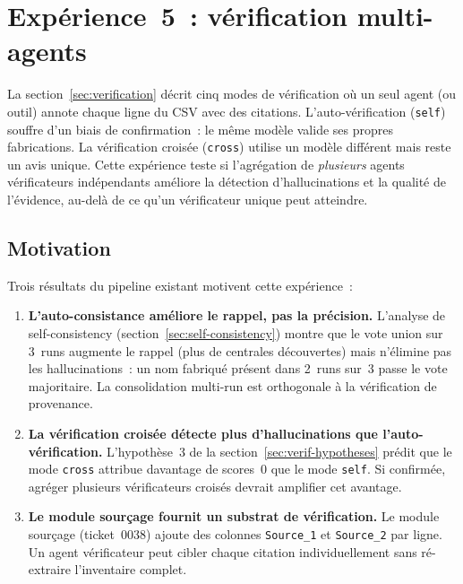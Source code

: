 %

\section{Exp\'erience~5~: v\'erification multi-agents}\label{sec:exp5}

La section~\ref{sec:verification} d\'ecrit cinq modes de v\'erification o\`u
un seul agent (ou outil) annote chaque ligne du CSV avec des citations.
L'auto-v\'erification (\texttt{self}) souffre d'un biais de confirmation~:
le m\^eme mod\`ele valide ses propres fabrications. La v\'erification crois\'ee
(\texttt{cross}) utilise un mod\`ele diff\'erent mais reste un avis unique. Cette
exp\'erience teste si l'agr\'egation de \emph{plusieurs} agents v\'erificateurs
ind\'ependants am\'eliore la d\'etection d'hallucinations et la qualit\'e de
l'\'evidence, au-del\`a de ce qu'un v\'erificateur unique peut atteindre.

\subsection{Motivation}\label{sec:multi-verif-motivation}

Trois r\'esultats du pipeline existant motivent cette exp\'erience~:

\begin{enumerate}
\item \textbf{L'auto-consistance am\'eliore le rappel, pas la pr\'ecision.}
  L'analyse de self-consistency (section~\ref{sec:self-consistency}) montre que
  le vote union sur 3~runs augmente le rappel (plus de centrales d\'ecouvertes)
  mais n'\'elimine pas les hallucinations~: un nom fabriqu\'e pr\'esent dans 2~runs
  sur~3 passe le vote majoritaire. La consolidation multi-run est orthogonale \`a
  la v\'erification de provenance.

\item \textbf{La v\'erification crois\'ee d\'etecte plus d'hallucinations que
  l'auto-v\'erification.}
  L'hypoth\`ese~3 de la section~\ref{sec:verif-hypotheses} pr\'edit que le mode
  \texttt{cross} attribue davantage de scores~0 que le mode \texttt{self}.
  Si confirm\'ee, agr\'eger plusieurs v\'erificateurs crois\'es devrait amplifier
  cet avantage.

\item \textbf{Le module sourçage fournit un substrat de v\'erification.}
  Le module sourçage (ticket~0038) ajoute des colonnes \texttt{Source\_1} et
  \texttt{Source\_2} par ligne. Un agent v\'erificateur peut cibler chaque
  citation individuellement sans r\'e-extraire l'inventaire complet.
\end{enumerate}

